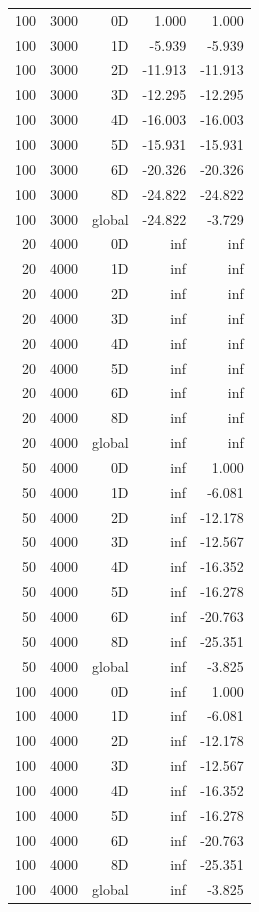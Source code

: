 \begin{longtable}{rrrrr}
100 & 3000 & 0D & 1.000 & 1.000 \\
100 & 3000 & 1D & -5.939 & -5.939 \\
100 & 3000 & 2D & -11.913 & -11.913 \\
100 & 3000 & 3D & -12.295 & -12.295 \\
100 & 3000 & 4D & -16.003 & -16.003 \\
100 & 3000 & 5D & -15.931 & -15.931 \\
100 & 3000 & 6D & -20.326 & -20.326 \\
100 & 3000 & 8D & -24.822 & -24.822 \\
100 & 3000 & global & -24.822 & -3.729 \\
20 & 4000 & 0D & inf & inf \\
20 & 4000 & 1D & inf & inf \\
20 & 4000 & 2D & inf & inf \\
20 & 4000 & 3D & inf & inf \\
20 & 4000 & 4D & inf & inf \\
20 & 4000 & 5D & inf & inf \\
20 & 4000 & 6D & inf & inf \\
20 & 4000 & 8D & inf & inf \\
20 & 4000 & global & inf & inf \\
50 & 4000 & 0D & inf & 1.000 \\
50 & 4000 & 1D & inf & -6.081 \\
50 & 4000 & 2D & inf & -12.178 \\
50 & 4000 & 3D & inf & -12.567 \\
50 & 4000 & 4D & inf & -16.352 \\
50 & 4000 & 5D & inf & -16.278 \\
50 & 4000 & 6D & inf & -20.763 \\
50 & 4000 & 8D & inf & -25.351 \\
50 & 4000 & global & inf & -3.825 \\
100 & 4000 & 0D & inf & 1.000 \\
100 & 4000 & 1D & inf & -6.081 \\
100 & 4000 & 2D & inf & -12.178 \\
100 & 4000 & 3D & inf & -12.567 \\
100 & 4000 & 4D & inf & -16.352 \\
100 & 4000 & 5D & inf & -16.278 \\
100 & 4000 & 6D & inf & -20.763 \\
100 & 4000 & 8D & inf & -25.351 \\
100 & 4000 & global & inf & -3.825 \\
\end{longtable}
